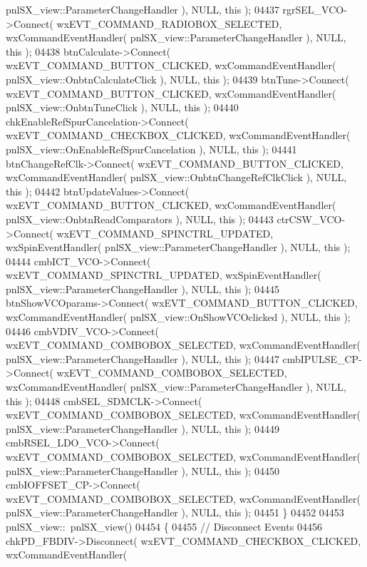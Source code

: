 \begin{DoxyCode}
      pnlSX_view::ParameterChangeHandler ), NULL, \textcolor{keyword}{this} );
04437     rgrSEL_VCO->Connect( wxEVT\_COMMAND\_RADIOBOX\_SELECTED, wxCommandEventHandler( 
      pnlSX_view::ParameterChangeHandler ), NULL, \textcolor{keyword}{this} );
04438     btnCalculate->Connect( wxEVT\_COMMAND\_BUTTON\_CLICKED, wxCommandEventHandler( 
      pnlSX_view::OnbtnCalculateClick ), NULL, \textcolor{keyword}{this} );
04439     btnTune->Connect( wxEVT\_COMMAND\_BUTTON\_CLICKED, wxCommandEventHandler( 
      pnlSX_view::OnbtnTuneClick ), NULL, \textcolor{keyword}{this} );
04440     chkEnableRefSpurCancelation->Connect( wxEVT\_COMMAND\_CHECKBOX\_CLICKED, wxCommandEventHandler( 
      pnlSX_view::OnEnableRefSpurCancelation ), NULL, \textcolor{keyword}{this} );
04441     btnChangeRefClk->Connect( wxEVT\_COMMAND\_BUTTON\_CLICKED, wxCommandEventHandler( 
      pnlSX_view::OnbtnChangeRefClkClick ), NULL, \textcolor{keyword}{this} );
04442     btnUpdateValues->Connect( wxEVT\_COMMAND\_BUTTON\_CLICKED, wxCommandEventHandler( 
      pnlSX_view::OnbtnReadComparators ), NULL, \textcolor{keyword}{this} );
04443     ctrCSW_VCO->Connect( wxEVT\_COMMAND\_SPINCTRL\_UPDATED, wxSpinEventHandler( 
      pnlSX_view::ParameterChangeHandler ), NULL, \textcolor{keyword}{this} );
04444     cmbICT_VCO->Connect( wxEVT\_COMMAND\_SPINCTRL\_UPDATED, wxSpinEventHandler( 
      pnlSX_view::ParameterChangeHandler ), NULL, \textcolor{keyword}{this} );
04445     btnShowVCOparams->Connect( wxEVT\_COMMAND\_BUTTON\_CLICKED, wxCommandEventHandler( 
      pnlSX_view::OnShowVCOclicked ), NULL, \textcolor{keyword}{this} );
04446     cmbVDIV_VCO->Connect( wxEVT\_COMMAND\_COMBOBOX\_SELECTED, wxCommandEventHandler( 
      pnlSX_view::ParameterChangeHandler ), NULL, \textcolor{keyword}{this} );
04447     cmbIPULSE_CP->Connect( wxEVT\_COMMAND\_COMBOBOX\_SELECTED, wxCommandEventHandler( 
      pnlSX_view::ParameterChangeHandler ), NULL, \textcolor{keyword}{this} );
04448     cmbSEL_SDMCLK->Connect( wxEVT\_COMMAND\_COMBOBOX\_SELECTED, wxCommandEventHandler( 
      pnlSX_view::ParameterChangeHandler ), NULL, \textcolor{keyword}{this} );
04449     cmbRSEL_LDO_VCO->Connect( wxEVT\_COMMAND\_COMBOBOX\_SELECTED, wxCommandEventHandler( 
      pnlSX_view::ParameterChangeHandler ), NULL, \textcolor{keyword}{this} );
04450     cmbIOFFSET_CP->Connect( wxEVT\_COMMAND\_COMBOBOX\_SELECTED, wxCommandEventHandler( 
      pnlSX_view::ParameterChangeHandler ), NULL, \textcolor{keyword}{this} );
04451 \}
04452 
04453 pnlSX_view::~pnlSX_view()
04454 \{
04455     \textcolor{comment}{// Disconnect Events}
04456     chkPD_FBDIV->Disconnect( wxEVT\_COMMAND\_CHECKBOX\_CLICKED, wxCommandEventHandler( 

\end{DoxyCode}
